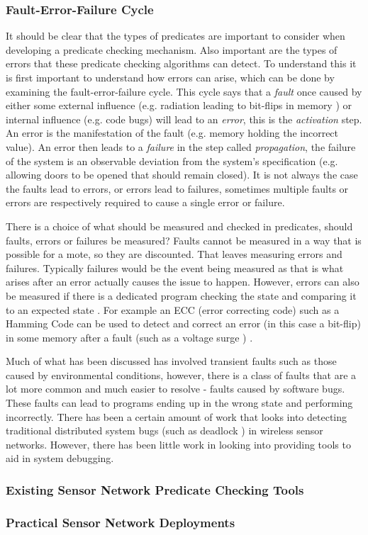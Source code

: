 \subsubsection*{Fault-Error-Failure Cycle}

It should be clear that the types of predicates are important to consider when developing a predicate checking mechanism. Also important are the types of errors that these predicate checking algorithms can detect. To understand this it is first important to understand how errors can arise, which can be done by examining the fault-error-failure cycle. This cycle says that a \emph{fault} once caused by either some external influence (e.g. radiation leading to bit-flips in memory \cite{?}) or internal influence (e.g. code bugs) will lead to an \emph{error}, this is the \emph{activation} step. An error is the manifestation of the fault (e.g. memory holding the incorrect value). An error then leads to a \emph{failure} in the step called \emph{propagation}, the failure of the system is an observable deviation from the system's specification (e.g. allowing doors to be opened that should remain closed). It is not always the case the faults lead to errors, or errors lead to failures, sometimes multiple faults or errors are respectively required to cause a single error or failure. \cite{1335465}

There is a choice of what should be measured and checked in predicates, should faults, errors or failures be measured? Faults cannot be measured \cite{?} in a way that is possible for a mote, so they are discounted. That leaves measuring errors and failures. Typically failures would be the event being measured \cite{?} as that is what arises after an error actually causes the issue to happen. However, errors can also be measured if there is a dedicated program checking the state and comparing it to an expected state \cite{?}. For example an ECC (error correcting code) such as a Hamming Code can be used to detect and correct an error (in this case a bit-flip) in some memory after a fault (such as a voltage surge ) \cite{hamming1950error}.

Much of what has been discussed has involved transient faults such as those caused by environmental conditions, however, there is a class of faults that are a lot more common and much easier to resolve - faults caused by software bugs. These faults can lead to programs ending up in the wrong state and performing incorrectly. There has been a certain amount of work that looks into detecting traditional distributed system bugs (such as deadlock \cite{?}) in wireless sensor networks. However, there has been little work in looking into providing tools to aid in system debugging.


\subsubsection*{Existing Sensor Network Predicate Checking Tools}


\subsubsection*{Practical Sensor Network Deployments}



